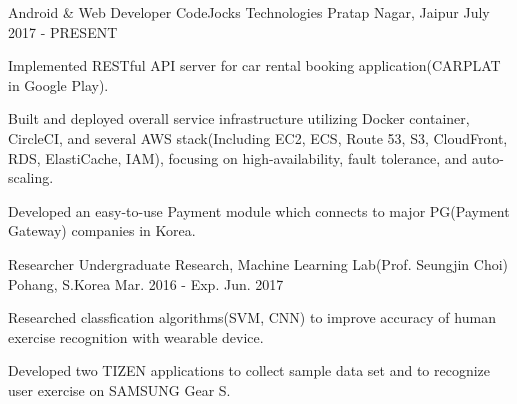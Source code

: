 

\begin{cventries}

  \cventry
    {Android \& Web Developer} %
    {CodeJocks Technologies} %
    {Pratap Nagar, Jaipur} %
    {July 2017 - PRESENT} %
    {
      \begin{cvitems} %
        \item {Implemented RESTful API server for car rental booking application(CARPLAT in Google Play).}
        \item {Built and deployed overall service infrastructure utilizing Docker container, CircleCI, and several AWS stack(Including EC2, ECS, Route 53, S3, CloudFront, RDS, ElastiCache, IAM), focusing on high-availability, fault tolerance, and auto-scaling.}
        \item {Developed an easy-to-use Payment module which connects to major PG(Payment Gateway) companies in Korea.}
      \end{cvitems}
    }

  \cventry
    {Researcher} %
    {Undergraduate Research, Machine Learning Lab(Prof. Seungjin Choi)} %
    {Pohang, S.Korea} %
    {Mar. 2016 - Exp. Jun. 2017} %
    {
      \begin{cvitems} %
        \item {Researched classfication algorithms(SVM, CNN) to improve accuracy of human exercise recognition with wearable device.}
        \item {Developed two TIZEN applications to collect sample data set and to recognize user exercise on SAMSUNG Gear S.}
      \end{cvitems}
    }


\end{cventries}
